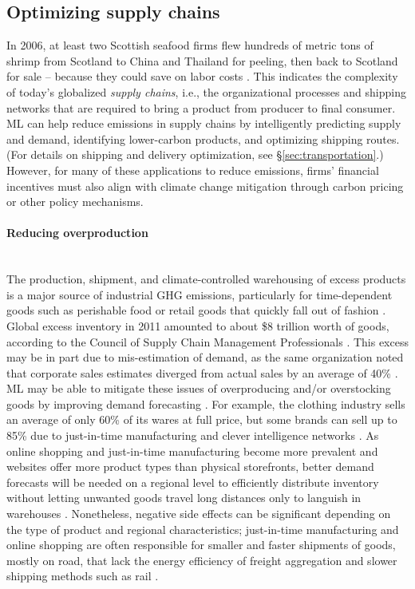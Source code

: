 \documentclass[11pt]{report}
\newcommand{\Gap}{\texorpdfstring{\hfill}{}}
\newcommand{\HighRisk}{\texorpdfstring{{\small\emph{\color{orange}{\fbox{Uncertain Impact}}}}}{}}
\begin{document}
\subsection{Optimizing supply chains}
\label{sec:supplychains}
In 2006, at least two Scottish seafood firms flew hundreds of metric tons of shrimp from Scotland to China and Thailand for peeling, then back to Scotland for sale -- because they could save on labor costs \cite{Cramb2006}. This indicates the complexity of today's globalized \emph{supply chains}, i.e., the organizational processes and shipping networks that are required to bring a product from producer to final consumer. ML can help reduce emissions in supply chains by intelligently predicting supply and demand, identifying lower-carbon products, and optimizing shipping routes. (For details on shipping and delivery optimization, see \S\ref{sec:transportation}.) However, for many of these applications to reduce emissions, firms' financial incentives must also align with climate change mitigation through carbon pricing or other policy mechanisms.

\paragraph*{Reducing overproduction} \Gap \HighRisk\mbox{}\\\label{sec:reducingexcess}The production, shipment, and climate-controlled warehousing of excess products is a major source of industrial GHG emissions, particularly for time-dependent goods such as perishable food or retail goods that quickly fall out of fashion \cite{wang2016energy}. 
Global excess inventory in 2011 amounted to about \$8 trillion worth of goods, according to the Council of Supply Chain Management Professionals \cite{winston2011}. This excess may be in part due to mis-estimation of demand, as the same organization noted that corporate sales estimates diverged from actual sales by an average of 40\% \cite{winston2011}. ML may be able to mitigate these issues of overproducing and/or overstocking goods by improving demand forecasting \cite{akyuz2017ensemble, tsoumakas2019survey}. For example, the clothing industry sells an average of only 60\% of its wares at full price, but some brands can sell up to 85\% due to just-in-time manufacturing and clever intelligence networks \cite{SCMGlobe2016}. As online shopping and just-in-time manufacturing become more prevalent and websites offer more product types than physical storefronts, better demand forecasts will be needed on a regional level to efficiently distribute inventory without letting unwanted goods travel long distances only to languish in warehouses \cite{rizet2010ghg}. Nonetheless, negative side effects can be significant depending on the type of product and regional characteristics; just-in-time manufacturing and online shopping are often responsible for smaller and faster shipments of goods, mostly on road, that lack the energy efficiency of freight aggregation and slower shipping methods such as rail \cite{ugarte2016lean, rizet2010ghg}.
\end{document}
